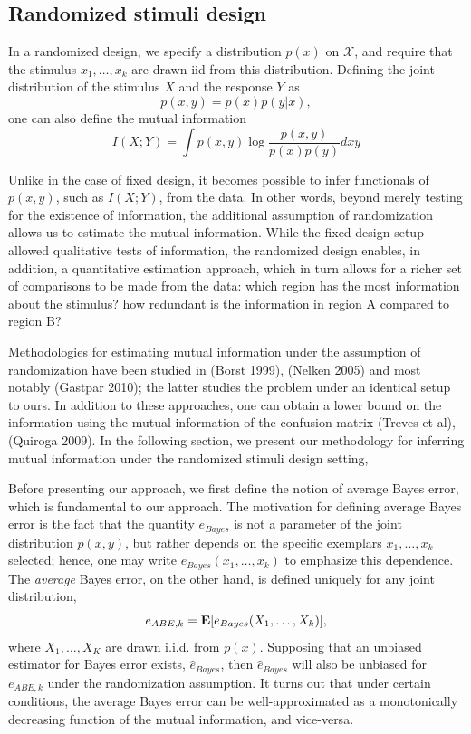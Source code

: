 \documentclass[12pt]{article}
\begin{document}
\subsection{Randomized stimuli design}

In a randomized design, we specify a distribution $p(x)$ on $\mathcal{X}$,
and require that the stimulus $x_1,\hdots, x_k$ are drawn iid from this distribution.
Defining the joint distribution of the stimulus $X$ and the response $Y$ as
\[
p(x, y) = p(x) p(y|x),
\]
one can also define the mutual information
\[
I(X; Y) = \int p(x, y) \log \frac{p(x, y)}{p(x) p(y)} dxy
\]

Unlike in the case of fixed design, it becomes possible to infer functionals of $p(x, y)$, such as $I(X; Y)$,
from the data.
In other words, beyond merely testing for the existence of information,
the additional assumption of randomization allows us to estimate the mutual information.
While the fixed design setup allowed qualitative tests of information,
the randomized design enables, in addition, a quantitative estimation approach,
which in turn allows for a richer set of comparisons to be made from the data:
which region has the most information about the stimulus?  
how redundant is the information in region A compared to region B?

Methodologies for estimating mutual information under the assumption of randomization
have been studied in (Borst 1999), (Nelken 2005) and most notably (Gastpar 2010); the latter
studies the problem under an identical setup to ours.  In addition to these approaches,
one can obtain a lower bound on the information using the mutual information of the confusion matrix
(Treves et al), (Quiroga 2009).  In the following section, we present our methodology for
inferring mutual information under the randomized stimuli design setting,

Before presenting our approach, we first define the notion of average Bayes error, which is fundamental to our approach.
The motivation for defining average Bayes error is the fact that the quantity $e_{Bayes}$ is not
a parameter of the joint distribution $p(x, y)$, but rather depends on
the specific exemplars $x_1,\hdots, x_k$ selected; hence, one may
write $e_{Bayes}(x_1,\hdots, x_k)$ to emphasize this dependence. 
The \emph{average} Bayes error, on the other hand, is defined uniquely for any joint distribution,
\begin{equation}\label{eq:abe}
e_{ABE, k} = \textbf{E}[e_{Bayes}(X_1,\hdots, X_k)],
\end{equation}
where $X_1,\hdots, X_K$ are drawn i.i.d. from $p(x)$.
Supposing that an unbiased estimator for Bayes error exists, $\hat{e}_{Bayes}$,
then $\hat{e}_{Bayes}$ will also be unbiased for $e_{ABE, k}$ under the randomization assumption.
It turns out that under certain conditions, the average Bayes error can be well-approximated as a monotonically decreasing function of the mutual information, and vice-versa.
\end{document}
